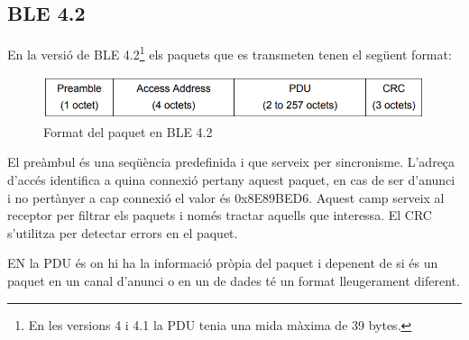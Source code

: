 \subsection{BLE 4.2}
En la versió de BLE 4.2\footnote{En les versions 4 i 4.1 la PDU tenia una mida màxima de 39 bytes.} els paquets que es transmeten tenen el següent format:

\begin{figure}[!h]
	\begin{center}
		\includegraphics[width=1\textwidth]{./images/Packet_format_4_2.png}
		\caption{Format del paquet en BLE 4.2 \cite{BLE_4.2_packet_format}}
	\end{center}
\end{figure}

El preàmbul és una seqüència predefinida i que serveix per sincronisme.
L'adreça d'accés identifica a quina connexió pertany aquest paquet, en cas de ser d'anunci i no pertànyer a cap connexió el valor és 0x8E89BED6.
Aquest camp serveix al receptor per filtrar els paquets i només tractar aquells que interessa.
El CRC s'utilitza per detectar errors en el paquet. 

EN la PDU és on hi ha la informació pròpia del paquet i depenent de si és un paquet en un canal d'anunci o en un de dades té un format lleugerament diferent.

\begin{figure}[!h]
	\begin{center}
		\begin{subfigmatrix}{1}
		\end{subfigmatrix}
	\end{center}
\end{figure}

